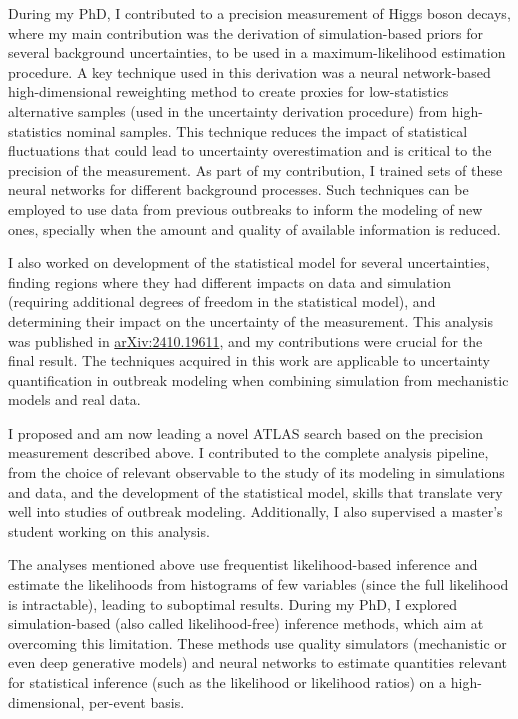 \documentclass[11pt, a4paper]{awesome-cv}
\begin{document}
\begin{cvletter}
During my PhD, I contributed to a precision measurement of Higgs boson decays, where my main contribution was the derivation of simulation-based priors for several background uncertainties, to be used in a maximum-likelihood estimation procedure. A key technique used in this derivation was a neural network-based high-dimensional reweighting method to create proxies for low-statistics alternative samples (used in the uncertainty derivation procedure) from high-statistics nominal samples. This technique reduces the impact of statistical fluctuations that could lead to uncertainty overestimation and is critical to the precision of the measurement. As part of my contribution, I trained sets of these neural networks for different background processes. Such techniques can be employed to use data from previous outbreaks to inform the modeling of new ones, specially when the amount and quality of available information is reduced.

I also worked on development of the statistical model for several uncertainties, finding regions where they had different impacts on data and simulation (requiring additional degrees of freedom in the statistical model), and determining their impact on the uncertainty of the measurement. This analysis was published in \href{https://arxiv.org/abs/2410.19611}{arXiv:2410.19611}, and my contributions were crucial for the final result. The techniques acquired in this work are applicable to uncertainty quantification in outbreak modeling when combining simulation from mechanistic models and real data.

I proposed and am now leading a novel ATLAS search based on the precision measurement described above. I contributed to the complete analysis pipeline, from the choice of relevant observable to the study of its modeling in simulations and data, and the development of the statistical model, skills that translate very well into studies of outbreak modeling. Additionally, I also supervised a master's student working on this analysis.


The analyses mentioned above use frequentist likelihood-based inference and estimate the likelihoods from histograms of few variables (since the full likelihood is intractable), leading to suboptimal results. During my PhD, I explored simulation-based (also called likelihood-free) inference methods, which aim at overcoming this limitation. These methods use quality simulators (mechanistic or even deep generative models) and neural networks to estimate quantities relevant for statistical inference (such as the likelihood or likelihood ratios) on a high-dimensional, per-event basis.


\end{cvletter}
\end{document}
